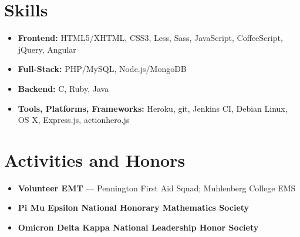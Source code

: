 \documentclass[11pt]{article}
\begin{document}
\section*{Skills}
\begin{itemize}
  \item \textbf{Frontend:} HTML5/XHTML, CSS3, Less, Sass, JavaScript, CoffeeScript, jQuery, Angular
  \item \textbf{Full-Stack:} PHP/MySQL, Node.js/MongoDB
  \item \textbf{Backend:} C, Ruby, Java
  \item \textbf{Tools, Platforms, Frameworks:} Heroku, git, Jenkins CI, Debian Linux, OS X, Express.js, actionhero.js
\end{itemize}



\section*{Activities and Honors}
\begin{itemize}
  \item \textbf{Volunteer EMT} --- Pennington First Aid Squad; Muhlenberg College EMS
  \item \textbf{Pi Mu Epsilon National Honorary Mathematics Society}
  \item \textbf{Omicron Delta Kappa National Leadership Honor Society}
\end{itemize}
\end{document}
